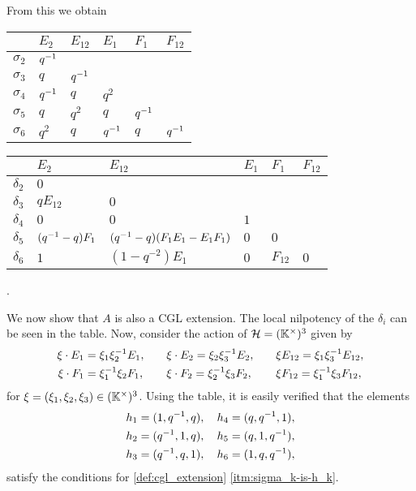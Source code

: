 \begin{example}
	From this we obtain
	\begin{center}
		\begin{tabular}{c|lllll}
			           & $E_2$   & $E_{12}$ & $E_{1}$ & $F_1$   & $F_{12}$ \\
			\hline
			$\sigma_2$ & $q^{-1}$                                           \\
			$\sigma_3$ & $q$     & $q^{-1}$                                 \\
			$\sigma_4$ & $q^{-1}$ & $q$      & $q^2$                        \\
			$\sigma_5$ & $q$     & $q^2$    & $q$     & $q^{-1}$            \\
			$\sigma_6$ & $q^2$   & $q$      & $q^{-1}$ & $q$     & $q^{-1}$
		\end{tabular}
		\begin{tabular}{c|lllll}
			           & $E_2$           & $E_{12}$                        & $E_{1}$ & $F_1$    & $F_{12}$ \\
			\hline
			$\delta_2$ & $0$                                                                               \\
			$\delta_3$ & $q E_{12}$      & $0$                                                             \\
			$\delta_4$ & $0$             & $0$                             & $1$                           \\
			$\delta_5$ & $(q^{-1} -q)F_1$ & $(q^{-1} -q)(F_1 E_1 - E_1 F_1)$ & $0$     & $0$                 \\
			$\delta_6$ & $1$             & $(1- q^{-2})E_1$                & $0$     & $F_{12}$ & $0$
		\end{tabular}
	\end{center}.

	We now show that $A$ is also a CGL extension. The local nilpotency of the $\delta_i$
	can be seen in the table. Now, consider the action of $\mathcal{H} = (\mathbb{K}^\times)^3$ given by
	\begin{align*}
		\xi \cdot E_1 & = \xi_1\xi_2^{-1} E_1, \quad &  & \xi \cdot E_2 = \xi_2\xi_3^{-1} E_2, \quad &  & \xi E_{12} = \xi_1 \xi_3^{-1} E_{12}, \\
		\xi \cdot F_1 & = \xi_1^{-1}\xi_2F_1, \quad  &  & \xi \cdot F_2 = \xi_2^{-1}\xi_3 F_2, \quad  &  & \xi F_{12} = \xi_1^{-1} \xi_3 F_{12},
	\end{align*}
	for $\xi = (\xi_1, \xi_2, \xi_3) \in (\mathbb{K}^\times)^3$. Using the table, it is easily
	verified that the elements
	\begin{align*}
		h_1 & = (1, q^{-1}, q), \quad h_4 = (q, q^{-1}, 1), \\
		h_2 & = (q^{-1},1, q), \quad h_5 = (q,1, q^{-1}),   \\
		h_3 & = (q^{-1}, q, 1), \quad h_6 = (1, q, q^{-1}),
	\end{align*}
	satisfy the conditions for \cref{def:cgl_extension} \cref{itm:sigma_k-is-h_k}.
\end{example}

